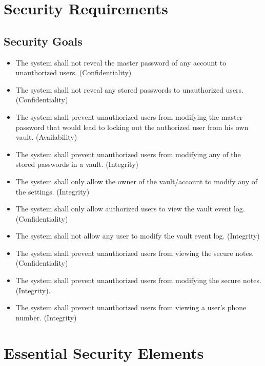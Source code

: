 \documentclass{article}
\begin{document}
\section{Security Requirements}
\label{sec:security_requirements}

\subsection{Security Goals}
\label{sub:security_goals}
\begin{itemize}
  \item The system shall not reveal the master password of any account to unauthorized users. (Confidentiality)
  \item The system shall not reveal any stored passwords to unauthorized users. (Confidentiality)
  \item The system shall prevent unauthorized users from modifying the master password that would lead to locking out the authorized user from his own vault. (Availability)
  \item The system shall prevent unauthorized users from modifying any of the stored passwords in a vault. (Integrity)
  \item The system shall only allow the owner of the vault/account to modify any of the settings. (Integrity)
  \item The system shall only allow authorized users to view the vault event log. (Confidentiality)
  \item The system shall not allow any user to modify the vault event log. (Integrity)
  \item The system shall prevent unauthorized users from viewing the secure notes. (Confidentiality)
  \item The system shall prevent unauthorized users from modifying the secure notes. (Integrity).
  \item The system shall prevent unauthorized users from viewing a user's phone number. (Integrity)
\end{itemize}

\section{Essential Security Elements}
\label{sec:essential_security_elements}
\end{document}
